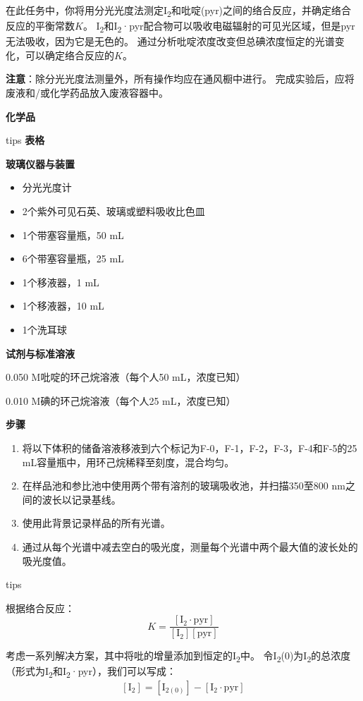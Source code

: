 在此任务中，你将用分光光度法测定I\textsubscript{2}和吡啶(pyr)之间的络合反应，并确定络合反应的平衡常数\(K\)。
I\textsubscript{2}和I\textsubscript{2}·pyr配合物可以吸收电磁辐射的可见光区域，但是pyr无法吸收，因为它是无色的。
通过分析吡啶浓度改变但总碘浓度恒定的光谱变化，可以确定络合反应的\(K\)。

\noindent\textbf{注意}：除分光光度法测量外，所有操作均应在通风橱中进行。
完成实验后，应将废液和/或化学药品放入废液容器中。

\noindent\textbf{化学品}


tips \textbf{表格}

\noindent\textbf{玻璃仪器与装置}

\begin{itemize}
\tightlist
\item
  分光光度计
\item
  2个紫外可见石英、玻璃或塑料吸收比色皿
\item
  1个带塞容量瓶，50 mL
\item
  6个带塞容量瓶，25 mL
\item
  1个移液器，1 mL
\item
  1个移液器，10 mL
\item
  1个洗耳球
\end{itemize}

\noindent\textbf{试剂与标准溶液}

0.050 M吡啶的环己烷溶液（每个人50 mL，浓度已知）

0.010 M碘的环己烷溶液（每个人25 mL，浓度已知）

\noindent\textbf{步骤}
\begin{enumerate}
\tightlist
\item
  将以下体积的储备溶液移液到六个标记为F-0，F-1，F-2，F-3，F-4和F-5的25
  mL容量瓶中，用环己烷稀释至刻度，混合均匀。
\item
  在样品池和参比池中使用两个带有溶剂的玻璃吸收池，并扫描350至800
  nm之间的波长以记录基线。
\item
  使用此背景记录样品的所有光谱。
\item
  通过从每个光谱中减去空白的吸光度，测量每个光谱中两个最大值的波长处的吸光度值。
\end{enumerate}

tips

根据络合反应： \[
K=\frac{[\mathrm{I_2\cdot pyr}]}{[\mathrm{I_2}][\mathrm{pyr}]}
\] 

考虑一系列解决方案，其中将吡的增量添加到恒定的I\textsubscript{2}中。
令I\textsubscript{2}(0)为I\textsubscript{2}的总浓度（形式为I\textsubscript{2}和I\textsubscript{2}·pyr），我们可以写成：
\[
\mathrm{[I_2]=[I_{2(0)}]-[I_2\cdot pyr]}
\] 


